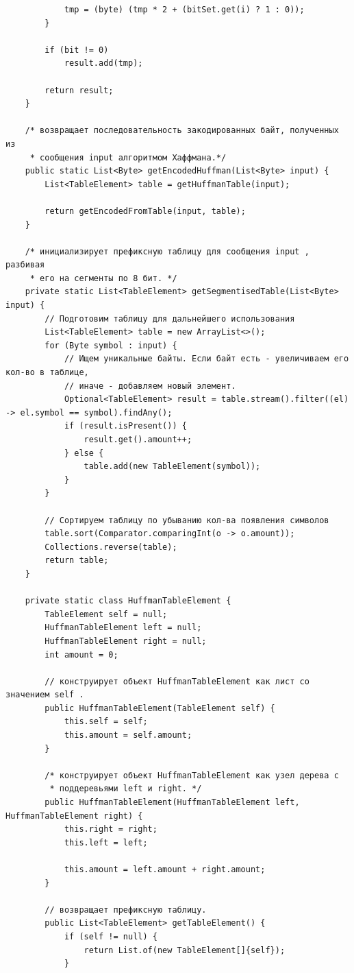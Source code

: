 \documentclass[a4paper,14pt]{extarticle}
\begin{document}
\begin{verbatim}
            tmp = (byte) (tmp * 2 + (bitSet.get(i) ? 1 : 0));
        }

        if (bit != 0)
            result.add(tmp);

        return result;
    }

    /* возвращает последовательность закодированных байт, полученных из
     * сообщения input алгоритмом Хаффмана.*/
    public static List<Byte> getEncodedHuffman(List<Byte> input) {
        List<TableElement> table = getHuffmanTable(input);

        return getEncodedFromTable(input, table);
    }

    /* инициализирует префиксную таблицу для сообщения input , разбивая
     * его на сегменты по 8 бит. */
    private static List<TableElement> getSegmentisedTable(List<Byte> input) {
        // Подготовим таблицу для дальнейшего использования
        List<TableElement> table = new ArrayList<>();
        for (Byte symbol : input) {
            // Ищем уникальные байты. Если байт есть - увеличиваем его кол-во в таблице,
            // иначе - добавляем новый элемент.
            Optional<TableElement> result = table.stream().filter((el) -> el.symbol == symbol).findAny();
            if (result.isPresent()) {
                result.get().amount++;
            } else {
                table.add(new TableElement(symbol));
            }
        }

        // Сортируем таблицу по убыванию кол-ва появления символов
        table.sort(Comparator.comparingInt(o -> o.amount));
        Collections.reverse(table);
        return table;
    }

    private static class HuffmanTableElement {
        TableElement self = null;
        HuffmanTableElement left = null;
        HuffmanTableElement right = null;
        int amount = 0;

        // конструирует объект HuffmanTableElement как лист со значением self .
        public HuffmanTableElement(TableElement self) {
            this.self = self;
            this.amount = self.amount;
        }

        /* конструирует объект HuffmanTableElement как узел дерева с
         * поддеревьями left и right. */
        public HuffmanTableElement(HuffmanTableElement left, HuffmanTableElement right) {
            this.right = right;
            this.left = left;

            this.amount = left.amount + right.amount;
        }

        // возвращает префиксную таблицу.
        public List<TableElement> getTableElement() {
            if (self != null) {
                return List.of(new TableElement[]{self});
            }


\end{verbatim}
\end{document}
